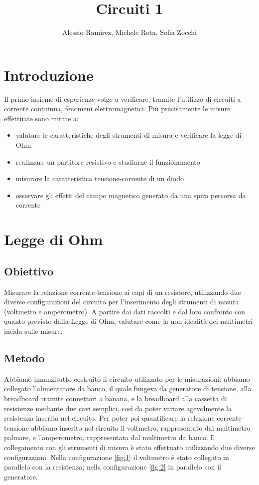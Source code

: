 \documentclass[a4paper]{article}
\title{Circuiti 1}
\author{Alessio Ramirez, Michele Rota, Sofia Zocchi}
\begin{document}
\maketitle

\tableofcontents
\newpage

\section{Introduzione}
Il primo insieme di esperienze volge a verificare, tramite l'utilizzo di circuiti a
corrente contuinua, fenomeni elettromagnetici. Più precisamente le misure effettuate sono mirate a:
\begin{itemize}
	\item valutare le caratteristiche degli strumenti di misura e verificare la legge di Ohm
	\item realizzare un partitore resistivo e studiarne il funzionamento
	\item misurare la caratteristica tensione-corrente di un diodo
	\item osservare gli effetti del campo magnetico generato da una spira percorsa da corrente

\end{itemize}

\section{Legge di Ohm}
\subsection{Obiettivo}
Misurare la relazione corrente-tensione ai capi di un resistore, utilizzando due diverse configurazioni del circuito per l'inserimento degli strumenti di misura
(voltmetro e amperometro). A partire dai dati raccolti e dal loro confronto con quanto previsto dalla Legge di Ohm, valutare come la non idealità dei multimetri incida sulle misure.
\subsection{Metodo}
Abbiamo innanzitutto costruito il circuito utilizzato per le misurazioni: abbiamo collegato l'alimentatore da banco, il quale fungeva da generatore di tensione, alla breadboard tramite connettori a banana,
e la breadboard alla cassetta di resistenze mediante due cavi semplici, così da poter variare agevolmente la resistenza inserita nel circuito.
Per poter poi quantificare la relazione corrente-tensione abbiamo inserito nel circuito il voltmetro, rappresentato dal multimetro palmare, e l'amperometro, rappresentata dal multimetro da banco.
Il collegamento con gli strumenti di misura è stato effettuato utilizzando due diverse configurazioni. Nella configurazione \ref{fig:1} il voltmetro è stato collegato in parallelo con la resistenza;
nella configurazione \ref{fig:2} in parallelo con il generatore.
\end{document}
